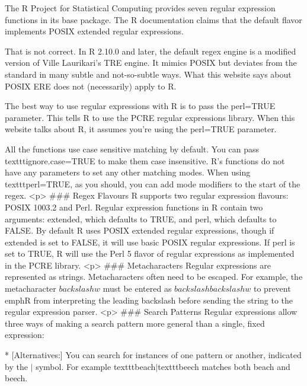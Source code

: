 

The R Project for Statistical Computing provides seven regular expression functions in its base package. The R documentation claims that the default flavor implements POSIX extended regular expressions. 

That is not correct. In R 2.10.0 and later, the default regex engine is a modified version of Ville Laurikari's TRE engine. It mimics POSIX but deviates from the standard in many subtle and not-so-subtle ways. What this website says about POSIX ERE does not (necessarily) apply to R.


The best way to use regular expressions with R is to pass the perl=TRUE parameter. This tells R to use the PCRE regular expressions library. When this website talks about R, it assumes you're using the perl=TRUE parameter.

All the functions use case sensitive matching by default. You can pass texttt{ignore.case=TRUE} to make them case insensitive. R's functions do not have any parameters to set any other matching modes. When using texttt{perl=TRUE}, as you should, you can add mode modifiers to the start of the regex.
<p>
### {Regex Flavours}
R supports two regular expression flavours: POSIX 1003.2 and Perl. Regular expression functions in R contain two arguments: extended, which defaults to TRUE, and perl, which defaults to FALSE. By default R uses POSIX extended regular expressions, though if extended is set to FALSE, it will use basic POSIX regular expressions. If perl is set to TRUE, R will use the Perl 5 flavor of regular expressions as implemented in the PCRE library.
<p>
### {Metacharacters}
Regular expressions are represented as strings. Metacharacters often need to be escaped. For example, the metacharacter $backslash w$ must be entered as $backslashbackslash w$ to prevent emph{R} from interpreting the leading backslash before sending the string to the regular expression parser.
<p>
### {Search Patterns}
Regular expressions allow three ways of making a search pattern more general than a single, fixed expression:

 
        * [Alternatives:] You can search for instances of one pattern or another, indicated by the $|$ symbol. For example texttt{beach}$|$texttt{beech} matches both beach and beech.

